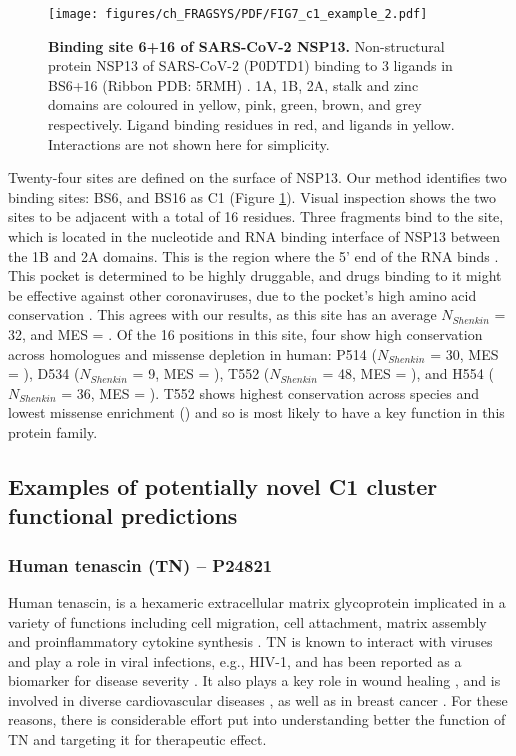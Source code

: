 \begin{figure}[h]
    \centering
    \texttt{[image: figures/ch\_FRAGSYS/PDF/FIG7\_c1\_example\_2.pdf]}
    \caption[Binding site 6+16 of SARS-CoV-2 NSP13]{\textbf{Binding site 6+16 of SARS-CoV-2 NSP13.} Non-structural protein NSP13 of SARS-CoV-2 (P0DTD1) binding to 3 ligands in BS6+16 (Ribbon PDB: 5RMH) \cite{NEWMAN_2021_SARSCOV2}. 1A, 1B, 2A, stalk and zinc domains are coloured in yellow, pink, green, brown, and grey respectively. Ligand binding residues in red, and ligands in yellow. Interactions are not shown here for simplicity.}
    \label{fig:c1_example_2}
\end{figure}

Twenty-four sites are defined on the surface of NSP13. Our method identifies two binding sites: BS6, and BS16 as C1 (Figure \ref{fig:c1_example_2}). Visual inspection shows the two sites to be adjacent with a total of 16 residues. Three fragments bind to the site, which is located in the nucleotide and RNA binding interface of NSP13 between the 1B and 2A domains. This is the region where the 5’ end of the RNA binds \cite{YAN_2020_SARSCOV2}. This pocket is determined to be highly druggable, and drugs binding to it might be effective against other coronaviruses, due to the pocket’s high amino acid conservation \cite{NEWMAN_2021_SARSCOV2}. This agrees with our results, as this site has an average $N_{Shenkin}$ = 32, and MES = . Of the 16 positions in this site, four show high conservation across homologues and missense depletion in human: P514 ($N_{Shenkin}$ = 30, MES = ), D534 ($N_{Shenkin}$ = 9, MES = ), T552 ($N_{Shenkin}$ = 48, MES = ), and H554 ($N_{Shenkin}$ = 36, MES = ). T552 shows highest conservation across species and lowest missense enrichment () and so is most likely to have a key function in this protein family.

\subsection{Examples of potentially novel C1 cluster functional predictions}

\subsubsection{Human tenascin (TN) -- P24821}

Human tenascin, is a hexameric extracellular matrix glycoprotein implicated in a variety of functions including cell migration, cell attachment, matrix assembly and proinflammatory cytokine synthesis \cite{BHATTACHARYYA_2022_TNC}. TN is known to interact with viruses and play a role in viral infections, e.g., HIV-1, and has been reported as a biomarker for disease severity \cite{ZULIANI_2023_TNC}. It also plays a key role in wound healing \cite{WANG_2022_TNC}, and is involved in diverse cardiovascular diseases \cite{KHOMTCHOUK_2022_TNC}, as well as in breast cancer \cite{LEPUCKI_2022_TNC}. For these reasons, there is considerable effort put into understanding better the function of TN and targeting it for therapeutic effect.

